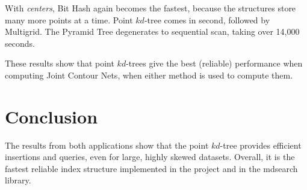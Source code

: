 With \textit{centers}, Bit Hash again becomes the fastest, because the structures store many more points at a time. Point $kd$-tree comes in second, followed by Multigrid. The Pyramid Tree degenerates to sequential scan, taking over 14,000 seconds.

These results show that point $kd$-trees give the best (reliable) performance when computing Joint Contour Nets, when either method is used to compute them.

\section{Conclusion}

The results from both applications show that the point $kd$-tree provides efficient insertions and queries, even for large, highly skewed datasets. Overall, it is the fastest reliable index structure implemented in the project and in the mdsearch library.